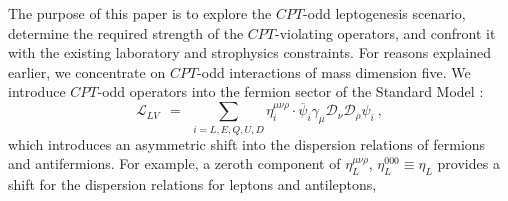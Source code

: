 \documentclass[12pt]{revtex4}
\newcommand{\md}{\mathcal{D}}
\newcommand{\ov}{\overline}
\begin{document}
    
    The purpose of this paper is to explore the $CPT$-odd leptogenesis scenario, 
    determine the required strength of the $CPT$-violating operators, and confront it with the 
    existing laboratory and strophysics constraints. 
 For reasons explained earlier, we  concentrate on $CPT$-odd interactions of mass dimension five. 
%	
	We introduce $CPT$-odd operators into the fermion sector of the Standard Model
\cite{MP:}:
\begin{equation}
\label{LV}
	\mathcal{L}_{LV} ~~=~~ \sum_{i=L,E,Q,U,D}\eta_i^{\mu\nu\rho}\cdot \ov{\psi}_i\gamma_\mu \md_\nu \md_\rho \psi_i~,
\end{equation}
	which introduces an asymmetric shift into the dispersion relations of fermions and antifermions.
	For example, a zeroth component of $ \eta_L^{\mu\nu\rho} $, $ \eta_L^{000} \equiv \eta_L $ provides a 
	shift for the dispersion relations for leptons and antileptons, 
\end{document}
